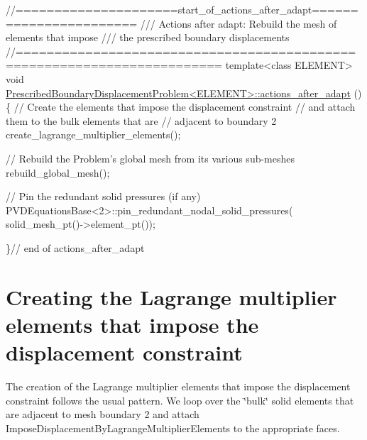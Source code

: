  
\begin{DoxyCodeInclude}
\textcolor{comment}{//=====================start\_of\_actions\_after\_adapt=======================}
\textcolor{comment}{///  Actions after adapt: Rebuild the mesh of elements that impose}
\textcolor{comment}{}\textcolor{comment}{/// the prescribed boundary displacements}
\textcolor{comment}{}\textcolor{comment}{//========================================================================}
\textcolor{keyword}{template}<\textcolor{keyword}{class} ELEMENT>
\textcolor{keywordtype}{void} \hyperlink{classPrescribedBoundaryDisplacementProblem_aae7225db18ad5c8429c0eb96fa37b585}{PrescribedBoundaryDisplacementProblem<ELEMENT>::actions\_after\_adapt}
      ()
\{
 \textcolor{comment}{// Create the elements that impose the displacement constraint }
 \textcolor{comment}{// and attach them to the bulk elements that are}
 \textcolor{comment}{// adjacent to boundary 2 }
 create\_lagrange\_multiplier\_elements();
 
 \textcolor{comment}{// Rebuild the Problem's global mesh from its various sub-meshes}
 rebuild\_global\_mesh();
 
 \textcolor{comment}{// Pin the redundant solid pressures (if any)}
 PVDEquationsBase<2>::pin\_redundant\_nodal\_solid\_pressures(
  solid\_mesh\_pt()->element\_pt());
 
\}\textcolor{comment}{// end of actions\_after\_adapt}

\end{DoxyCodeInclude}




 

\hypertarget{index_lagr_elements}{}\section{Creating the Lagrange multiplier elements that impose the displacement constraint}\label{index_lagr_elements}
The creation of the Lagrange multiplier elements that impose the displacement constraint follows the usual pattern. We loop over the \char`\"{}bulk\char`\"{} solid elements that are adjacent to mesh boundary 2 and attach {\ttfamily Impose\+Displacement\+By\+Lagrange\+Multiplier\+Elements} to the appropriate faces.

